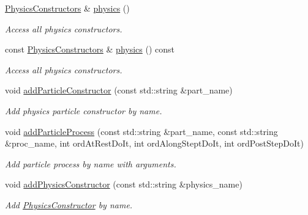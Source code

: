 \begin{DoxyCompactItemize}
\hyperlink{class_d_d4hep_1_1_simulation_1_1_geant4_physics_list_a5953826b626c21fa4b26ab9a07f3b8ad}{PhysicsConstructors} \& \hyperlink{class_d_d4hep_1_1_simulation_1_1_geant4_physics_list_a02c18b4acdacd390c3c1b1c4609f1c7b}{physics} ()
\begin{DoxyCompactList}\small\item\em Access all physics constructors. \item\end{DoxyCompactList}\item 
const \hyperlink{class_d_d4hep_1_1_simulation_1_1_geant4_physics_list_a5953826b626c21fa4b26ab9a07f3b8ad}{PhysicsConstructors} \& \hyperlink{class_d_d4hep_1_1_simulation_1_1_geant4_physics_list_aff2be21114872cdd3f1450b6fcf9996f}{physics} () const 
\begin{DoxyCompactList}\small\item\em Access all physics constructors. \item\end{DoxyCompactList}\item 
void \hyperlink{class_d_d4hep_1_1_simulation_1_1_geant4_physics_list_ac4d76361cc1b439b42dc144a1e7fa988}{addParticleConstructor} (const std::string \&part\_\-name)
\begin{DoxyCompactList}\small\item\em Add physics particle constructor by name. \item\end{DoxyCompactList}\item 
void \hyperlink{class_d_d4hep_1_1_simulation_1_1_geant4_physics_list_a8c689c3ac8a923ff713c4389b5b502b4}{addParticleProcess} (const std::string \&part\_\-name, const std::string \&proc\_\-name, int ordAtRestDoIt, int ordAlongSteptDoIt, int ordPostStepDoIt)
\begin{DoxyCompactList}\small\item\em Add particle process by name with arguments. \item\end{DoxyCompactList}\item 
void \hyperlink{class_d_d4hep_1_1_simulation_1_1_geant4_physics_list_af9405b117100861f7e365e8362a35fa4}{addPhysicsConstructor} (const std::string \&physics\_\-name)
\begin{DoxyCompactList}\small\item\em Add \hyperlink{class_d_d4hep_1_1_simulation_1_1_geant4_physics_list_1_1_physics_constructor}{PhysicsConstructor} by name. \item\end{DoxyCompactList}\item 

\end{DoxyCompactItemize}
